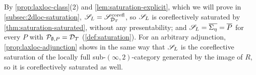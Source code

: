 \begin{rmk}
\label{rmk:laxloc-saturated}
%
By \cref{prop:laxloc-class}(2) and \cref{lem:saturation-explicit}, which we will
prove in \cref{subsec:2dloc-saturation},
$\mathscr{S}_{L} = \mathscr{S}^{\mathrm{corefl}}_{\mathcal{D}_{T}}$,
so $\mathscr{S}_{L}$ is coreflectively saturated by \cref{thm:saturation-saturated},
without any presentability; and
$\mathscr{S}_{L} = \overline{\Sigma_{\eta}} = \overline{P}$
for every $P$ with
$\mathcal{P}_{\emptyset,P} = \mathcal{D}_{T}$
(\cref{def:saturation}). For an arbitrary adjunction,
\cref{prop:laxloc-adjunction}
shows in the same way that $\mathscr{S}_{L}$ is the coreflective saturation of the
locally full sub-$(\infty,2)$-category generated by the image of $R$, so it is
coreflectively saturated as well.
\end{rmk}

